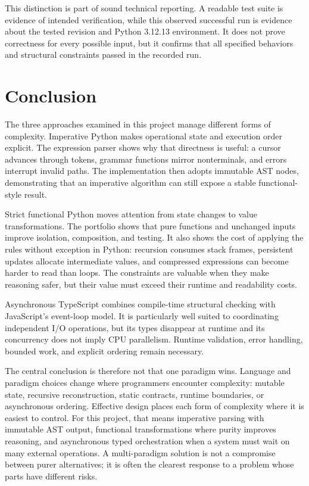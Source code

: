 \documentclass[12pt]{article}
\begin{document}
This distinction is part of sound technical reporting. A readable test suite is evidence of intended verification, while this observed successful run is evidence about the tested revision and Python 3.12.13 environment. It does not prove correctness for every possible input, but it confirms that all specified behaviors and structural constraints passed in the recorded run.


\section{Conclusion}

The three approaches examined in this project manage different forms of complexity. Imperative Python makes operational state and execution order explicit. The expression parser shows why that directness is useful: a cursor advances through tokens, grammar functions mirror nonterminals, and errors interrupt invalid paths. The implementation then adopts immutable AST nodes, demonstrating that an imperative algorithm can still expose a stable functional-style result.


Strict functional Python moves attention from state changes to value transformations. The portfolio shows that pure functions and unchanged inputs improve isolation, composition, and testing. It also shows the cost of applying the rules without exception in Python: recursion consumes stack frames, persistent updates allocate intermediate values, and compressed expressions can become harder to read than loops. The constraints are valuable when they make reasoning safer, but their value must exceed their runtime and readability costs.


Asynchronous TypeScript combines compile-time structural checking with JavaScript's event-loop model. It is particularly well suited to coordinating independent I/O operations, but its types disappear at runtime and its concurrency does not imply CPU parallelism. Runtime validation, error handling, bounded work, and explicit ordering remain necessary.


The central conclusion is therefore not that one paradigm wins. Language and paradigm choices change where programmers encounter complexity: mutable state, recursive reconstruction, static contracts, runtime boundaries, or asynchronous ordering. Effective design places each form of complexity where it is easiest to control. For this project, that means imperative parsing with immutable AST output, functional transformations where purity improves reasoning, and asynchronous typed orchestration when a system must wait on many external operations. A multi-paradigm solution is not a compromise between purer alternatives; it is often the clearest response to a problem whose parts have different risks.
\end{document}
